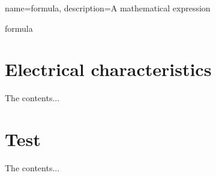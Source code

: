 \documentclass[a4paper,11pt,twoside]{report}
\begin{document}

\author{Piotr Zdunek}

\linespread{1.15}
\setlength{\parskip}{2ex plus 0.5ex minus 0.2ex}
\setlength{\parindent}{0.5cm}



\cleardoublepage
\cleardoublepage

\pagestyle{empty}
\cleardoublepage
\tableofcontents
\newpage

{
        name=formula,
        description={A mathematical expression}
}
 


%

%



\gls{formula}






\printglossary
\listoffigures
\begin{appendices}
\chapter{Electrical characteristics}
The contents...
\chapter{Test }
The contents...
\end{appendices}
\end{document}
